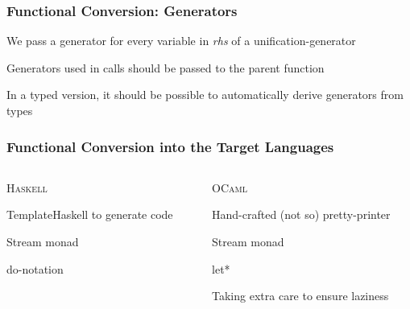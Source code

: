 \documentclass[xcolor=table, aspectratio=169]{beamer}
\newcommand{\ocaml}{\textsc{OCaml}\xspace}
\newcommand{\haskell}{\textsc{Haskell}\xspace}
\begin{document}
\begin{frame}[fragile]
  \frametitle{Functional Conversion: Generators}
\begin{center}
We pass a generator for every variable in \emph{rhs} of a unification-generator
\end{center}

\begin{center}
Generators used in calls should be passed to the parent function
\end{center}

\begin{center}
In a typed version, it should be possible to automatically derive generators from types
\end{center}

    
\end{frame}

\begin{frame}[fragile]
  \frametitle{Functional Conversion into the Target Languages}
\begin{columns}
  \begin{column}[t]{0.45\textwidth}

\begin{center}
  \haskell
\end{center}

\begin{center}
  TemplateHaskell to generate code
\end{center}

\begin{center}
  Stream monad
\end{center}

\begin{center}
  do-notation
\end{center}

\begin{center}

\end{center}

  \end{column}
  \begin{column}[t]{0.45\textwidth}
\begin{center}
  \ocaml
\end{center}
\begin{center}
  Hand-crafted (not so) pretty-printer
\end{center}

\begin{center}
  Stream monad
\end{center}

\begin{center}
  let*
\end{center}

\begin{center}
  Taking extra care to ensure laziness
\end{center}

  \end{column}
\end{columns}

\end{frame}
\end{document}
